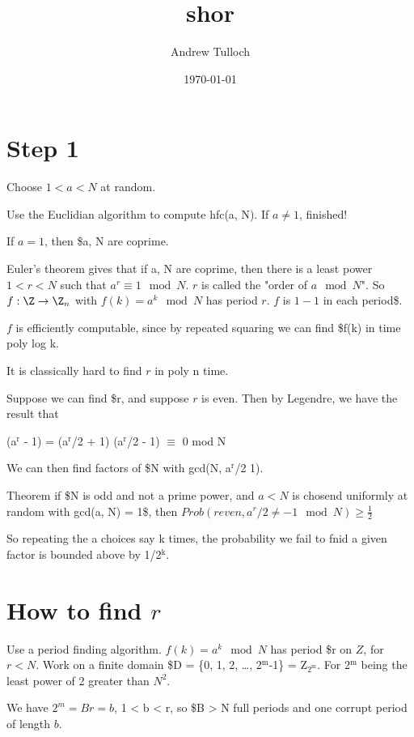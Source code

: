 \documentclass[11pt]{article}
\author{Andrew Tulloch}
\date{\today}
\title{shor}
\begin{document}
\maketitle
\tableofcontents

\section{Step 1}
\label{sec-1}

Choose $1 < a < N$ at random.

Use the Euclidian algorithm to compute hfc(a, N).  If $a \neq 1$,
finished!


If $a = 1$, then \$a, N are coprime.

Euler's theorem gives that if a, N are coprime, then there is a
least power $1 < r < N$ such that $a^r \equiv 1 \mod N$.  $r$ is
called the "order of $a \mod N$".  So $f: \Z \rightarrow \Z_n$ with
$f(k) = a^k \mod N$ has period $r$.  $f$ is $1-1$ in each period\$.

$f$ is efficiently computable, since by repeated squaring we can
find \$f(k) in time poly log k.

It is classically hard to find $r$ in poly n time.

Suppose we can find \$r, and suppose $r$ is even.  Then by Legendre, we
have the result that

(a$^{\text{r}}$ - 1) = (a$^{\text{r}}$/2 + 1) (a$^{\text{r}}$/2 - 1) $\equiv$ 0 mod N

We can then find factors of \$N with gcd(N, a$^{\text{r}}$/2 \textpm{} 1).

Theorem if \$N is odd and not a prime power, and $a < N$ is chosend
uniformly at random with gcd(a, N) = 1\$, then $Prob(r even, a^r/2
  \neq -1 \mod N) \geq \frac{1}{2}$

So repeating the a choices say k times, the probability we fail to
fnid a given factor is bounded above by 1/2$^{\text{k}}$.

\section{How to find $r$}
\label{sec-2}
Use a period finding algorithm.  $f(k) = a^k \mod N$ has period \$r
on $Z$, for $r < N$.  Work on a finite domain \$D = \{0, 1, 2, \dots{},
2$^{\text{m}}$-1\} = Z$_{\text{2}^{\text{m}}}$.  For 2$^{\text{m}}$ being the least power of 2 greater than
$N^2$.

We have $2^m = Br = b$, 1 < b < r, so \$B > N full periods and one
corrupt period of length $b$.
\end{document}

